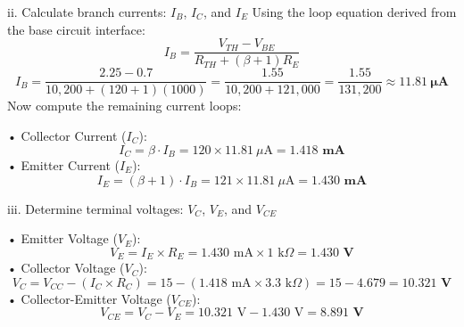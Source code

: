 ii. Calculate branch currents: $I_B$, $I_C$, and $I_E$
Using the loop equation derived from the base circuit interface:
$$I_B = \frac{V_{TH} - V_{BE}}{R_{TH} + (\beta + 1)R_E}$$ 
$$I_B = \frac{2.25 - 0.7}{10,200 + (120 + 1)(1000)} = \frac{1.55}{10,200 + 121,000} = \frac{1.55}{131,200} \approx \mathbf{11.81\ \mu\text{A}}$$ 
Now compute the remaining current loops:


• Collector Current ($I_C$):
$$I_C = \beta \cdot I_B = 120 \times 11.81\ \mu\text{A} = \mathbf{1.418\text{ mA}}$$ 
• Emitter Current ($I_E$):
$$I_E = (\beta + 1) \cdot I_B = 121 \times 11.81\ \mu\text{A} = \mathbf{1.430\text{ mA}}$$ 


iii. Determine terminal voltages: $V_C$, $V_E$, and $V_{CE}$


• Emitter Voltage ($V_E$):
$$V_E = I_E \times R_E = 1.430\text{ mA} \times 1\text{ k}\Omega = \mathbf{1.430\text{ V}}$$ 
• Collector Voltage ($V_C$):
$$V_C = V_{CC} - (I_C \times R_C) = 15 - (1.418\text{ mA} \times 3.3\text{ k}\Omega) = 15 - 4.679 = \mathbf{10.321\text{ V}}$$ 
• Collector-Emitter Voltage ($V_{CE}$):
$$V_{CE} = V_C - V_E = 10.321\text{ V} - 1.430\text{ V} = \mathbf{8.891\text{ V}}$$ 
